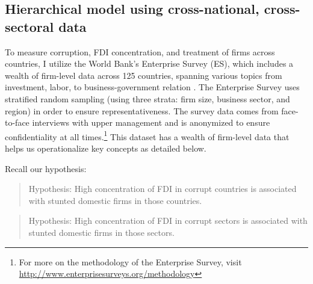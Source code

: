 \subsection{Hierarchical model using cross-national, cross-sectoral data}

To measure corruption, FDI concentration, and treatment of firms across countries, I utilize the World Bank's Enterprise Survey (ES), which includes a wealth of firm-level data across 125 countries, spanning various topics from investment, labor, to business-government relation \citep{WorldBank2015}. The Enterprise Survey uses stratified random sampling (using three strata: firm size, business sector, and region) in order to ensure representativeness. The survey data comes from face-to-face interviews with upper management and is anonymized to ensure confidentiality at all times.\footnote{For more on the methodology of the Enterprise Survey, visit \url{http://www.enterprisesurveys.org/methodology}} This dataset has a wealth of firm-level data that helps us operationalize key concepts as detailed below.

Recall our hypothesis:

\begin{quote}
Hypothesis: High concentration of FDI in corrupt countries is associated with stunted domestic firms in those countries.
\end{quote}

\begin{quote}
Hypothesis: High concentration of FDI in corrupt sectors is associated with stunted domestic firms in those sectors.
\end{quote}

